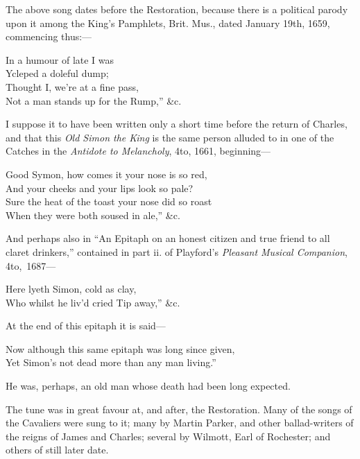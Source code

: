 The above song dates before the Restoration, because there is a political parody
upon it among the King’s Pamphlets, Brit. Mus., dated January 19th, 1659,
commencing thus:—
\settowidth{\versewidth}{Not a man stands up for the Rump,” \&c.}
\begin{scverse}
\begin{altverse}
In a humour of late I was\\
Ycleped a doleful dump;\\
Thought I, we’re at a fine pass,\\
Not a man stands up for the Rump,” \&c.
\end{altverse}
\end{scverse}
I suppose it to have been written only a short time before the return of Charles,
and that this \textit{Old Simon the King} is the same person alluded to in one of the
Catches in the \textit{Antidote to Melancholy}, 4to, 1661, beginning—

\settowidth{\versewidth}{Sure the heat of the toast your nose did so roast}
\begin{scverse}
\begin{altverse}
Good Symon, how comes it your nose is so red,\\
And your cheeks and your lips look so pale?\\
Sure the heat of the toast your nose did so roast\\
When they were both soused in ale,” \&c.
\end{altverse}
\end{scverse}
And perhaps also in “An Epitaph on an honest citizen and true friend to all
claret drinkers,” contained in part ii. of Playford’s \textit{Pleasant Musical Companion},
4to,~1687—
\begin{scverse}
Here lyeth Simon, cold as clay,\\
Who whilst he liv’d cried Tip away,” \&c.
\end{scverse}
At the end of this epitaph it is said—
\begin{scverse}
Now although this same epitaph was long since given,\\
Yet Simon’s not dead more than any man living.”
\end{scverse}
He was, perhaps, an old man whose death had been long expected.

The tune was in great favour at, and after, the Restoration. Many of the
songs of the Cavaliers were sung to it; many by Martin Parker, and other
ballad-writers of the reigns of James and Charles; several by Wilmott, Earl of
Rochester; and others of still later date.


